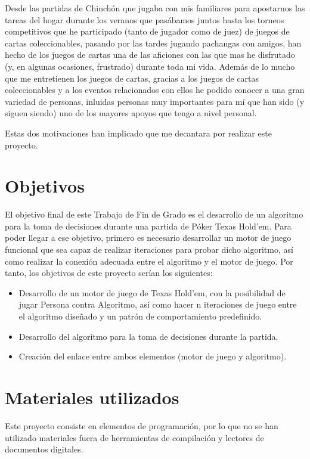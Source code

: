 Desde las partidas de Chinchón que jugaba con mis familiares para apostarnos las tareas del hogar durante los veranos que pasábamos juntos hasta los torneos competitivos que he participado (tanto de jugador como de juez) de juegos de cartas coleccionables, pasando por las tardes jugando pachangas con amigos, han hecho de los juegos de cartas una de las aficiones con las que mas he disfrutado (y, en algunas ocasiones, frustrado) durante toda mi vida.
Además de lo mucho que me entretienen los juegos de cartas, gracias a los juegos de cartas coleccionables y a los eventos relacionados con ellos he podido conocer a una gran variedad de personas, inluidas personas muy importantes para mí que han sido (y siguen siendo) uno de los mayores apoyos que tengo a nivel personal.

Estas dos motivaciones han implicado que me decantara por realizar este proyecto.

\section{Objetivos}

El objetivo final de este Trabajo de Fin de Grado es el desarrollo de un algoritmo para la toma de decisiones durante una partida de Póker Texas Hold’em. Para poder llegar a ese objetivo, primero es necesario desarrollar un motor de juego funcional que sea capaz de realizar iteraciones para probar dicho algoritmo, así como realizar la conexión adecuada entre el algoritmo y el motor de juego. Por tanto, los objetivos de este proyecto serían los siguientes:
\begin{itemize}
\item Desarrollo de un motor de juego de Texas Hold’em, con la posibilidad de jugar Persona contra Algoritmo, así como hacer n iteraciones de juego entre el algoritmo diseñado y un patrón de comportamiento predefinido.
\item Desarrollo del algoritmo para la toma de decisiones durante la partida.
\item Creación del enlace entre ambos elementos (motor de juego y algoritmo).
\end{itemize} 

\section{Materiales utilizados}

Este proyecto consiste en elementos de programación, por lo que no se han utilizado materiales fuera de herramientas de compilación y lectores de documentos digitales.

